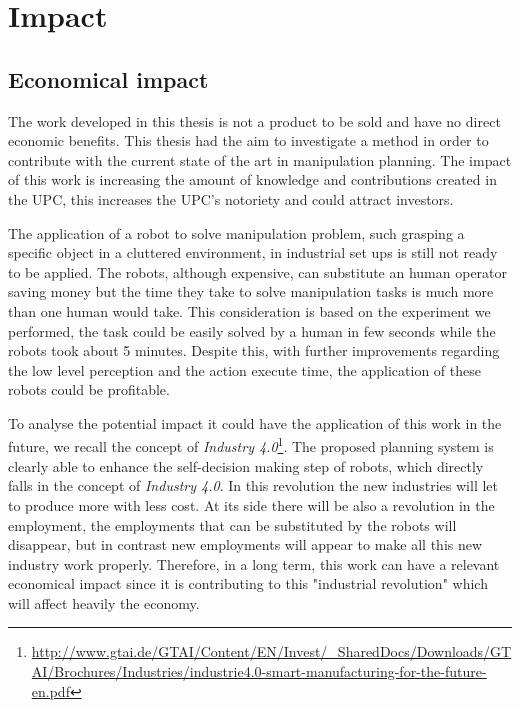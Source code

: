 \section{Impact}
\subsection*{Economical impact}
The work developed in this thesis is not a product to be sold and have no direct economic benefits. This thesis had the aim to investigate a method in order to contribute with the current state of the art in manipulation planning. The impact of this work is increasing the amount of knowledge and contributions created in the UPC, this increases the UPC's notoriety and could attract investors. 

The application of a robot to solve manipulation problem, such grasping a specific object in a cluttered environment, in industrial set ups is still not ready to be applied. The robots, although expensive, can substitute an human operator saving money but the time they take to solve manipulation tasks is much more than one human would take. This consideration is based on the experiment we performed, the task could be easily solved by a human in few seconds while the robots took about 5 minutes. Despite this, with further improvements regarding the low level perception and the action execute time, the application of these robots could be profitable.

To analyse the potential impact it could have the application of this work in the future, we recall the concept of \textit{Industry 4.0}\footnote{\href{http://www.gtai.de/GTAI/Content/EN/Invest/_SharedDocs/Downloads/GTAI/Brochures/Industries/industrie4.0-smart-manufacturing-for-the-future-en.pdf}{\url{http://www.gtai.de/GTAI/Content/EN/Invest/_SharedDocs/Downloads/GTAI/Brochures/Industries/industrie4.0-smart-manufacturing-for-the-future-en.pdf}}}.  The proposed planning system is clearly able to enhance the self-decision making step of robots, which directly falls in the concept of \textit{Industry 4.0}. 
In this revolution the new industries will let to produce more with less cost. At its side there will be also a revolution in the employment, the employments that can be substituted by the robots will disappear, but in contrast new employments will appear to make all this new industry work properly. 
Therefore, in a long term, this work can have a relevant economical impact since it is contributing to this "industrial revolution" which will affect heavily the economy. 


